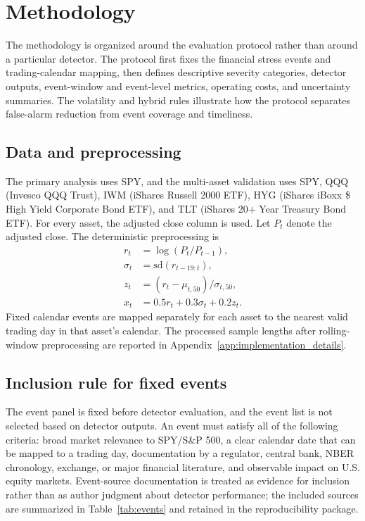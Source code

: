 \documentclass[pdflatex,sn-mathphys-num]{sn-jnl}
\begin{document}
\section{Methodology}
The methodology is organized around the evaluation protocol rather than around a particular detector. The protocol first fixes the financial stress events and trading-calendar mapping, then defines descriptive severity categories, detector outputs, event-window and event-level metrics, operating costs, and uncertainty summaries. The volatility and hybrid rules illustrate how the protocol separates false-alarm reduction from event coverage and timeliness.

\subsection{Data and preprocessing}
The primary analysis uses SPY, and the multi-asset validation uses SPY, QQQ (Invesco QQQ Trust), IWM (iShares Russell 2000 ETF), HYG (iShares iBoxx \$ High Yield Corporate Bond ETF), and TLT (iShares 20+ Year Treasury Bond ETF). For every asset, the adjusted close column is used. Let $P_t$ denote the adjusted close. The deterministic preprocessing is
\begin{align}
r_t &= \log(P_t/P_{t-1}),\\
\sigma_t &= \mathrm{sd}(r_{t-19:t}),\\
z_t &= (r_t-\mu_{t,50})/\sigma_{t,50},\\
x_t &= 0.5r_t + 0.3\sigma_t + 0.2z_t.
\end{align}
Fixed calendar events are mapped separately for each asset to the nearest valid trading day in that asset's calendar. The processed sample lengths after rolling-window preprocessing are reported in Appendix~\ref{app:implementation_details}.

\subsection{Inclusion rule for fixed events}
The event panel is fixed before detector evaluation, and the event list is not selected based on detector outputs. An event must satisfy all of the following criteria: broad market relevance to SPY/S\&P 500, a clear calendar date that can be mapped to a trading day, documentation by a regulator, central bank, NBER chronology, exchange, or major financial literature, and observable impact on U.S. equity markets. Event-source documentation is treated as evidence for inclusion rather than as author judgment about detector performance; the included sources are summarized in Table~\ref{tab:events} and retained in the reproducibility package.
\end{document}
